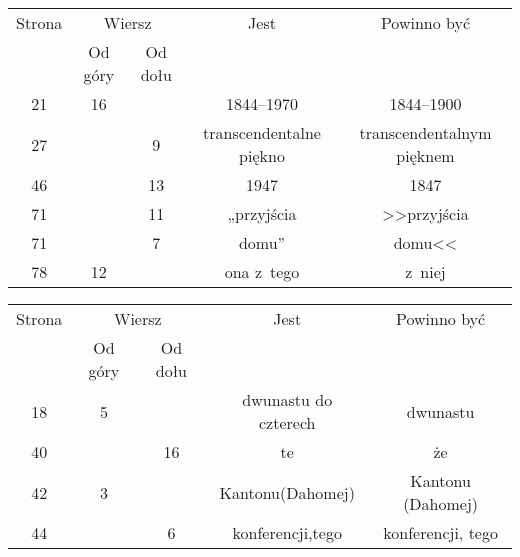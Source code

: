 \documentclass[a4paper,11pt]{article}
\begin{document}
\begin{center}

  \begin{tabular}{|c|c|c|c|c|}
    \hline
    Strona & \multicolumn{2}{c|}{Wiersz} & Jest
                              & Powinno być \\ \cline{2-3}
    & Od góry & Od dołu & & \\
    \hline
    21 & 16 & & 1844--1970 & 1844--1900 \\
    27 & & \hphantom{0}9 & transcendentalne piękno
    & transcendentalnym pięknem \\
    46 & & 13 & 1947 & 1847 \\
    71 & & 11 & „przyjścia & >>przyjścia \\
    71 & & \hphantom{0}7 & domu” & domu<< \\
    78 & 12 & & ona z~tego & z~niej \\
    \hline
  \end{tabular}

\end{center}









\newpage





\begin{center}

  \begin{tabular}{|c|c|c|c|c|}
    \hline
    Strona & \multicolumn{2}{c|}{Wiersz} & Jest
                              & Powinno być \\ \cline{2-3}
    & Od góry & Od dołu & & \\
    \hline
    18  & \hphantom{0}5 & & dwunastu do czterech & dwunastu \\
    40  & & 16 & te & że \\
    42  & \hphantom{0}3 & & Kantonu(Dahomej) & Kantonu (Dahomej) \\
    44  & & \hphantom{0}6 & konferencji,tego & konferencji, tego \\
    \hline
  \end{tabular}

\end{center}













{}






\end{document}
